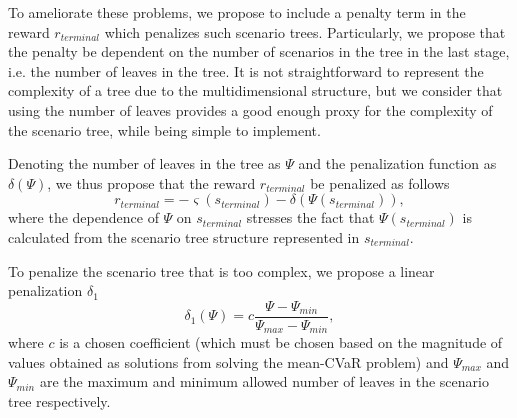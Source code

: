To ameliorate these problems, we propose to include a penalty term in the reward $r_{terminal}$ which penalizes such scenario trees. Particularly, we propose that the penalty be dependent on the number of scenarios in the tree in the last stage, i.e. the number of leaves in the tree. It is not straightforward to represent the complexity of a tree due to the multidimensional structure, but we consider that using the number of leaves provides a good enough proxy for the complexity of the scenario tree, while being simple to implement. 

Denoting the number of leaves in the tree as $\Psi$ and the penalization function as $\delta(\Psi)$, we thus propose that the reward $r_{terminal}$ be penalized as follows
\begin{equation*}
r_{terminal} = -\varsigma(s_{terminal}) - \delta(\Psi(s_{terminal})),
\end{equation*}
where the dependence of $\Psi$ on $s_{terminal}$ stresses the fact that $\Psi(s_{terminal})$ is calculated from the scenario tree structure represented in $s_{terminal}$.

To penalize the scenario tree that is too complex, we propose a linear penalization $\delta_1$
\begin{equation*}
\delta_1(\Psi) = c \frac{\Psi - \Psi_{min}}{\Psi_{max} - \Psi_{min}},
\end{equation*}
where $c$ is a chosen coefficient (which must be chosen based on the magnitude of values obtained as solutions from solving the mean-CVaR problem) and $\Psi_{max}$ and $\Psi_{min}$ are the maximum and minimum allowed number of leaves in the scenario tree respectively.



